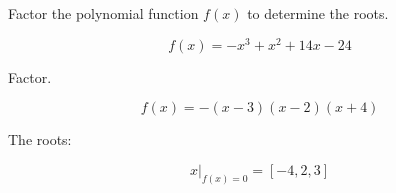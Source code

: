 
\begin{question}
Factor the polynomial function \(f(x)\) to determine the roots.

\[f(x) = - x^{3} + x^{2} + 14 x - 24 \]
\end{question}

\begin{solution}
Factor.

\[f(x) = - \left(x - 3\right) \left(x - 2\right) \left(x + 4\right)\]

The roots:

\[x|_{f(x)=0} = [-4, 2, 3]\]
\end{solution}


